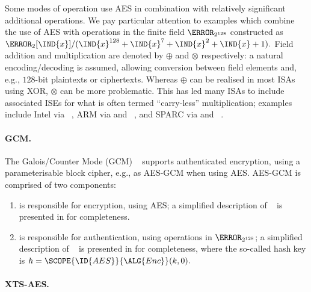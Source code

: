 Some modes of operation use AES in combination with relatively
  significant 
additional operations.  
We pay particular attention to examples which combine the use of AES with
operations in the finite field $\F_{2^{128}}$ constructed as
$
\F_{2}[\IND{x}] / ( \IND{x}^{128} + \IND{x}^{7} + \IND{x}^{2} + \IND{x} + 1 ) .
$
Field 
      addition
and
multiplication
are denoted by
$\oplus$
and
$\otimes$
respectively:
a natural encoding/decoding is assumed, allowing conversion between field 
elements and, e.g., $128$-bit plaintexts or ciphertexts.
Whereas $\oplus$ can be realised in most ISAs using XOR, $\otimes$ can be
more problematic.  This has led many ISAs to include associated ISEs for
what is often termed ``carry-less'' multiplication; 
examples include
Intel via ~\cite[Page 4-241]{X86:2:18},
ARM   via  and ~\cite[Section C7.2.215]{ARMv8-A:20},
and
SPARC via  and ~\cite[Section 7.143]{SPARC:16}.

\paragraph{GCM.}

The Galois/Counter Mode (GCM)
~\cite{NIST:sp.800.38d}
supports authenticated encryption, using a parameterisable block cipher,
e.g., as AES-GCM when using AES.
AES-GCM is comprised of two components:

\begin{enumerate}

\item {}
      is responsible for 
          encryption,
      using AES; 
      a simplified description of
      ~\cite[Algorithm 3]{NIST:sp.800.38d}
      is presented in
      for completeness.

\item {}
      is responsible for
      authentication,
      using operations in $\F_{2^{128}}$;
      a simplified description of
      ~\cite[Algorithm 2]{NIST:sp.800.38d}
      is presented in
      for completeness,
      where the so-called hash key is
      $
      h = \SCOPE{\ID{AES}}{\ALG{Enc}}( k, 0 ) .
      $

\end{enumerate}

\paragraph{XTS-AES.}

